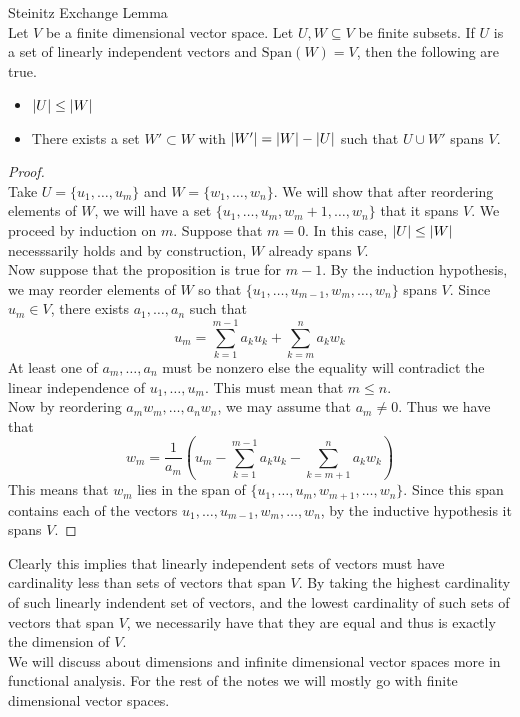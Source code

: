\documentclass[a4paper]{article}
\begin{document}
\begin{thm}{Steinitz Exchange Lemma}{}\\
Let $V$ be a finite dimensional vector space. Let $U,W\subseteq V$ be finite subsets. If $U$ is a set of linearly independent vectors and $\text{Span}(W)=V$, then the following are true. 
\begin{itemize}
\item $\abs{U}\leq\abs{W}$
\item There exists a set $W'\subset W$ with $\abs{W'}=\abs{W}-\abs{U}$ such that $U\cup W'$ spans $V$. 
\end{itemize} 
\begin{proof}\\
Take $U=\{u_1,\dots,u_m\}$ and $W=\{w_1,\dots,w_n\}$. We will show that after reordering elements of $W$, we will have a set $\{u_1,\dots,u_m,w_m+1,\dots,w_n\}$ that it spans $V$. We proceed by induction on $m$. Suppose that $m=0$. In this case, $\abs{U}\leq\abs{W}$ necesssarily holds and by construction, $W$ already spans $V$. \\
Now suppose that the proposition is true for $m-1$. By the induction hypothesis, we may reorder elements of $W$ so that $\{u_1,\dots,u_{m-1},w_m,\dots,w_n\}$ spans $V$. Since $u_m\in V$, there exists $a_1,\dots,a_n$ such that $$u_m=\sum_{k=1}^{m-1}a_ku_k+\sum_{k=m}^na_kw_k$$ At least one of $a_m,\dots,a_n$ must be nonzero else the equality will contradict the linear independence of $u_1,\dots,u_m$. This must mean that $m\leq n$. \\
Now by reordering $a_mw_m,\dots,a_nw_n$, we may assume that $a_m\neq 0$. Thus we have that $$w_m=\frac{1}{a_m}\left(u_m-\sum_{k=1}^{m-1}a_ku_k-\sum_{k=m+1}^na_kw_k\right)$$ This means that $w_m$ lies in the span of $\{u_1,\dots,u_m,w_{m+1},\dots,w_n\}$. Since this span contains each of the vectors $u_1,\dots,u_{m-1},w_m,\dots,w_n$, by the inductive hypothesis it spans $V$. 
\end{proof}
\end{thm}

Clearly this implies that linearly independent sets of vectors must have cardinality less than sets of vectors that span $V$. By taking the highest cardinality of such linearly indendent set of vectors, and the lowest cardinality of such sets of vectors that span $V$, we necessarily have that they are equal and thus is exactly the dimension of $V$. \\

We will discuss about dimensions and infinite dimensional vector spaces more in functional analysis. For the rest of the notes we will mostly go with finite dimensional vector spaces. \\
\end{document}
